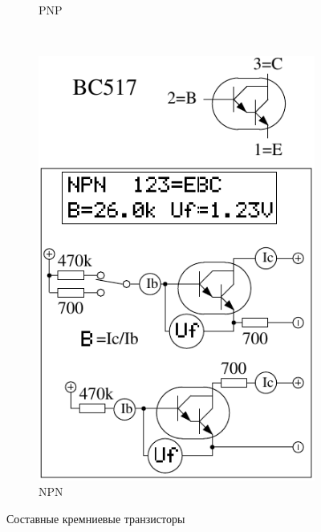 \begin{figure}[H]
\begin{subfigure}[b]{.5\textwidth}
    \caption{PNP}
    \label{fig:BJT-PNP-Darl}
  \end{subfigure}
  ~
  \begin{subfigure}[b]{.5\textwidth}
    \centering
    \includegraphics[width=1.\textwidth]{../FIG/BJT_BC517.pdf}
    \caption{NPN}
    \label{fig:BJT-NPN-Darl}
  \end{subfigure}
  \caption{Составные кремниевые транзисторы}
\end{figure}

